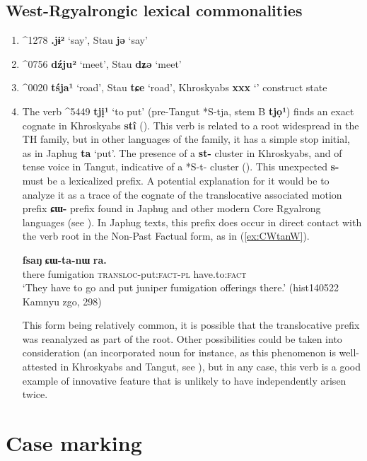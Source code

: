 \documentclass[oneside,a4paper,11pt]{article}
\newcommand{\ipa}[1]{{\phon\textbf{#1}}}
\newcommand{\wobzi}[2]{Khroskyabs \ipa{#1} `#2'}
\newcommand{\stau}[2]{Stau \ipa{#1} `#2'}
\newcommand{\tangut}[3]{\mo{#1}^{#1} \ipa{#2} `#3'}
\begin{document}
\subsection{West-Rgyalrongic lexical commonalities}
\begin{enumerate}
\item \tangut{1278}{.jɨ²}{say}, \stau{jə}{say}
\item \tangut{0756}{dźju²}{meet}, \stau{dʑə}{meet}
\item \tangut{0020}{tśja¹}{road}, \stau{tɕe}{road}, \wobzi{xxx}{} construct state
\item  The verb \tangut{5449}{tjị¹}{to put} (pre-Tangut *S-tja, stem B  \ipa{tjọ¹}) finds an exact cognate in Khroskyabs \ipa{stî} (\citealt{lai17khroskyabs}). This verb is related to a root widespread in the TH family, but in other languages of the family, it has a simple stop initial, as in Japhug \ipa{ta} `put'. The presence of  a \ipa{st-} cluster in Khroskyabs, and of tense voice in Tangut, indicative of a *S-t- cluster (\citealt{gong99jinyuanyin}). This unexpected \ipa{s-} must be a lexicalized prefix. A potential explanation for it would be to analyze it as a trace of the cognate of the translocative associated motion prefix \ipa{ɕɯ-} prefix found in Japhug and other modern Core Rgyalrong languages (see \citealt{jacques13harmonization}). In Japhug texts, this prefix does occur in direct contact with the verb root in the Non-Past Factual form, as in (\ref{ex:CWtanW}).

\begin{exe}
\ex \label{ex:CWtanW}
\gll \ipa{nɯtɕu} 	\ipa{fsaŋ} 	\ipa{ɕɯ-ta-nɯ} 	\ipa{ra.}  \\
 there fumigation \textsc{transloc}-put:\textsc{fact-pl} have.to:\textsc{fact} \\
 \glt `They have to go and put juniper fumigation offerings there.' (hist140522 Kamnyu zgo, 298)
\end{exe}

This form being relatively common, it is possible that the translocative prefix was reanalyzed as part of the root. Other possibilities could be taken into consideration (an incorporated noun for instance, as this phenomenon is well-attested in Khroskyabs and Tangut, see \citealt{jacques11tangut.verb}), but in any case, this verb is a good example of innovative feature that is unlikely to have independently arisen twice.
\end{enumerate}
\section{Case marking} 
\citet{jacques17stau}
\end{document}
